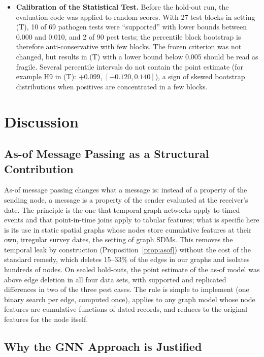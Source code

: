 \documentclass[a4paper,fleqn]{cas-sc}
\begin{document}
\begin{itemize}[leftmargin=1.4em]
\item \textbf{Calibration of the Statistical Test.}
Before the hold-out run, the evaluation code was applied to random scores. With 27 test blocks in setting (T), 10 of 69 pathogen tests were ``supported'' with lower bounds between 0.000 and 0.010, and 2 of 90 pest tests; the percentile block bootstrap is therefore anti-conservative with few blocks. The frozen criterion was not changed, but results in (T) with a lower bound below 0.005 should be read as fragile. Several percentile intervals do not contain the point estimate (for example H9 in (T): $+0.099$, $[-0.120, 0.140]$), a sign of skewed bootstrap distributions when positives are concentrated in a few blocks.

\end{itemize}

\section{Discussion}
\label{sec:discussion}

\subsection{As-of Message Passing as a Structural Contribution}

As-of message passing changes what a message is: instead of a property of the sending node, a message is a property of the sender evaluated at the receiver's date. The principle is the one that temporal graph networks apply to timed events \citep{xu2020tgat,rossi2020} and that point-in-time joins apply to tabular features; what is specific here is its use in static spatial graphs whose nodes store cumulative features at their own, irregular survey dates, the setting of graph SDMs. This removes the temporal leak by construction (Proposition~\ref{prop:asof}) without the cost of the standard remedy, which deletes 15--33\% of the edges in our graphs and isolates hundreds of nodes. On sealed hold-outs, the point estimate of the as-of model was above edge deletion in all four data sets, with supported and replicated differences in two of the three pest cases. The rule is simple to implement (one binary search per edge, computed once), applies to any graph model whose node features are cumulative functions of dated records, and reduces to the original features for the node itself.

\subsection{Why the GNN Approach is Justified}
\end{document}
